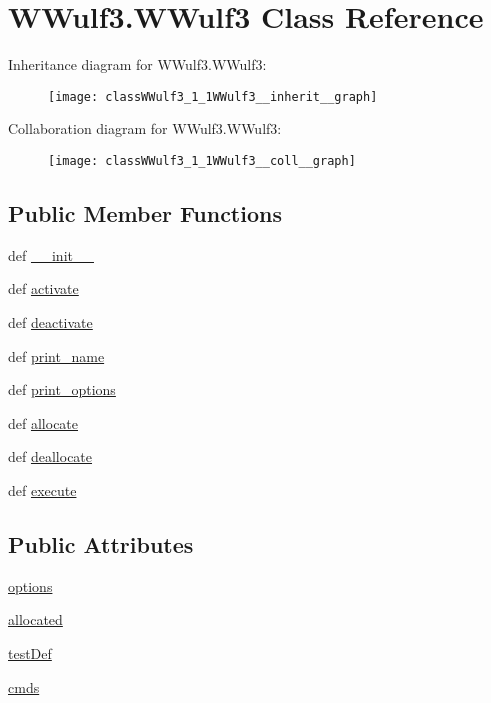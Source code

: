 \hypertarget{classWWulf3_1_1WWulf3}{\section{W\-Wulf3.\-W\-Wulf3 Class Reference}
\label{classWWulf3_1_1WWulf3}
}


Inheritance diagram for W\-Wulf3.\-W\-Wulf3\-:\nopagebreak
\begin{figure}[H]
\begin{center}
\leavevmode
\texttt{[image: classWWulf3\_1\_1WWulf3\_\_inherit\_\_graph]}
\end{center}
\end{figure}


Collaboration diagram for W\-Wulf3.\-W\-Wulf3\-:\nopagebreak
\begin{figure}[H]
\begin{center}
\leavevmode
\texttt{[image: classWWulf3\_1\_1WWulf3\_\_coll\_\_graph]}
\end{center}
\end{figure}
\subsection*{Public Member Functions}
\begin{DoxyCompactItemize}
\item 
def \hyperlink{classWWulf3_1_1WWulf3_a796bd38c05021cfe1058ece9a27a2df4}{\-\_\-\-\_\-init\-\_\-\-\_\-}
\item 
def \hyperlink{classWWulf3_1_1WWulf3_ae3ed31bec61b4caf00f9f96f6e05ffa1}{activate}
\item 
def \hyperlink{classWWulf3_1_1WWulf3_a3eafeb23e8b080a556a9817b93092c18}{deactivate}
\item 
def \hyperlink{classWWulf3_1_1WWulf3_a9054ae7fc728370cdbf0fc3521332e49}{print\-\_\-name}
\item 
def \hyperlink{classWWulf3_1_1WWulf3_ae507b747f83b985ee062daecc9538f17}{print\-\_\-options}
\item 
def \hyperlink{classWWulf3_1_1WWulf3_a190419acb6dae4278ac923171e0f16e8}{allocate}
\item 
def \hyperlink{classWWulf3_1_1WWulf3_aeeedd5c98d7ed91c4f0beb92a19e23bb}{deallocate}
\item 
def \hyperlink{classWWulf3_1_1WWulf3_a2320c2c37a10d678a6d35ffab6096385}{execute}
\end{DoxyCompactItemize}
\subsection*{Public Attributes}
\begin{DoxyCompactItemize}
\item 
\hyperlink{classWWulf3_1_1WWulf3_adff5ffd43f8b68d49c7b45ab48d7b428}{options}
\item 
\hyperlink{classWWulf3_1_1WWulf3_ad83bab03cfcdab3a5b689a0958db19e8}{allocated}
\item 
\hyperlink{classWWulf3_1_1WWulf3_a9e8732432df9211bd64454c4c0e04098}{test\-Def}
\item 
\hyperlink{classWWulf3_1_1WWulf3_afb4fb9db2456e29872155d9b8738418f}{cmds}
\end{DoxyCompactItemize}


